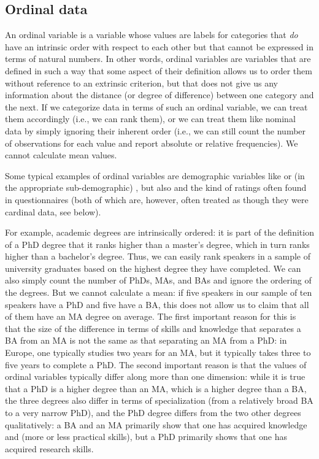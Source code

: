 \subsection{Ordinal data}
\label{sec:ordinaldata}

An ordinal  variable is a variable whose values are labels for categories  that \emph{do} have an intrinsic order with respect to each other but that cannot be expressed in terms of natural numbers. In other words, ordinal  variables are variables that are defined in such a way that some aspect of their definition allows us to order them without reference to an extrinsic criterion, but that does not give us any information about the distance (or degree of difference) between one category and the next. If we categorize  data in terms of such an ordinal  variable, we can treat them accordingly (i.e., we can rank them), or we can treat them like nominal  data by simply ignoring their inherent order (i.e., we can still count the number of observations  for each value and report absolute or relative frequencies).  We cannot calculate mean  values.

Some typical examples of ordinal  variables are demographic  variables like  or (in the appropriate sub\hyp{}demographic) , but also  and the kind of ratings often found in questionnaires (both of which are, however, often treated as though they were cardinal  data, see below).

For example, academic degrees are intrinsically ordered: it is part of the definition of a PhD degree that it ranks higher than a master's degree, which in turn ranks higher than a bachelor's degree. Thus, we can easily rank speakers in a sample of university graduates based on the highest degree they have completed. We can also simply count the number of PhDs, MAs, and BAs and ignore the ordering of the degrees. But we cannot calculate a mean:  if five speakers in our sample of ten speakers have a PhD and five have a BA, this does not allow us to claim that all of them have an MA degree on average. The first important reason for this is that the size of the difference in terms of skills and knowledge that separates a BA from an MA is not the same as that separating an MA from a PhD: in Europe,
one typically studies two years for an MA, but it typically takes three to five years to complete a PhD. The second important reason is that the values of ordinal  variables typically differ along more than one dimension: while it is true that a PhD is a higher degree than an MA, which is a higher degree than a BA, the three degrees also differ in terms of specialization (from a relatively broad BA to a very narrow PhD), and the PhD degree differs from the two other degrees qualitatively: a BA and an MA primarily show that one has acquired knowledge and (more or less practical skills), but a PhD primarily shows that one has acquired research skills.

